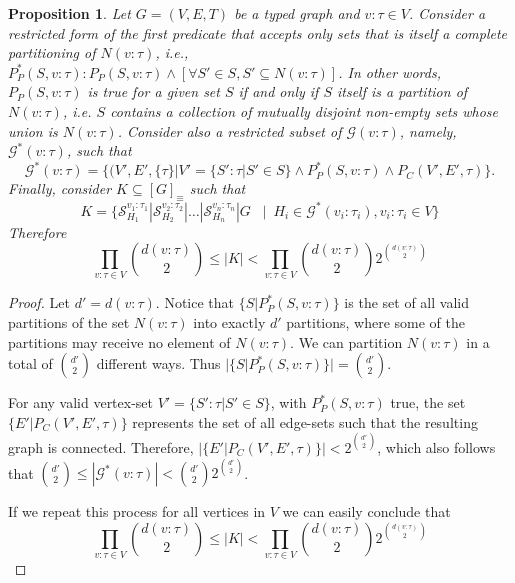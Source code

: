 \documentclass[preprint,12pt]{elsarticle}
\theoremstyle{plain}
\newtheorem{prop}[theorem]{Proposition}
\newcommand\tyv[2]{#1\!\!:\!\!#2}
\begin{document}
\begin{prop}\label{prop:sizereducedclass}
Let $G = (V,E,T)$ be a typed graph and $\tyv{v}{\tau}\in V$.
Consider a restricted form of the first predicate that accepts
only sets that is itself a complete partitioning of $N(\tyv{v}{\tau})$, i.e.,
$P_P^*(S, \tyv{v}{\tau}): P_P(S, \tyv{v}{\tau}) \wedge [\forall S'\in S, S'\subseteq N(\tyv{v}{\tau})]$.
In other words,
$P_P(S, \tyv{v}{\tau})$ is true for a given set $S$
if and only if
$S$ itself is a partition of $N(\tyv{v}{\tau})$,
i.e. $S$ contains 
a collection of mutually disjoint non-empty sets whose union is $N(\tyv{v}{\tau})$.
Consider also a restricted subset of $\mathcal{G}(\tyv{v}{\tau})$, namely, $\mathcal{G}^*(\tyv{v}{\tau})$, such that
\[
\mathcal{G}^*(\tyv{v}{\tau}) = \{(V',E',\{\tau\}|
    V'=\{\tyv{S'}{\tau}|S'\in S\}\wedge P_P^*(S, \tyv{v}{\tau}) \wedge P_C(V',E',\tau)\}.
\]
Finally, consider $K \subseteq [G]_\equiv$ such that
\[
K = \{ \mathcal{S}^{{v_1}:{\tau_1}}_{H_1}|\mathcal{S}^{{v_2}:{\tau_2}}_{H_2}|\dots|\mathcal{S}^{{v_n}:{\tau_n}}_{H_n}|G
             \,\,\,\,\,|\,\,\,   H_i\in\mathcal{G}^*(\tyv{v_i}{\tau_i}),\tyv{v_i}{\tau_i}\in V\}
\]
Therefore
\[
\prod_{v:\tau\in V} \binom{d(\tyv{v}{\tau})}{2} \leq |K| < \prod_{v:\tau\in V} \binom{d(\tyv{v}{\tau})}{2}2^{\binom{d(v:\tau)}{2}}
\]
\end{prop}
\begin{proof}
Let $d' = d(\tyv{v}{\tau})$.
Notice that $\{S|P_P^*(S, \tyv{v}{\tau})\}$
is the set of all
valid partitions of the set $N(\tyv{v}{\tau})$
into exactly $d'$ partitions, where some of the partitions may receive no
element of $N(\tyv{v}{\tau})$. We can partition $N(\tyv{v}{\tau})$
in a total of $\binom{d'}{2}$ different ways. Thus $|\{S|P_P^*(S, \tyv{v}{\tau})\}| = \binom{d'}{2}$.

For any valid vertex-set $V'=\{\tyv{S'}{\tau}|S'\in S\}$, with $P_P^*(S, \tyv{v}{\tau})$ true,
the set $\{E'| P_C(V',E',\tau)\}$ represents the set of all edge-sets such that the resulting graph is connected.
Therefore, $|\{E'| P_C(V',E',\tau)\}| < 2^{\binom{d'}{2}}$,
which also follows that $\binom{d'}{2} \leq |\mathcal{G}^*(\tyv{v}{\tau})| < \binom{d'}{2}2^{\binom{d'}{2}}$.

If we repeat this process for all vertices in $V$
we can easily conclude that
\[
\prod_{v:\tau\in V} \binom{d(\tyv{v}{\tau})}{2} \leq |K| < \prod_{v:\tau\in V} \binom{d(\tyv{v}{\tau})}{2}2^{\binom{d(v:\tau)}{2}}
\]
\end{proof}
\end{document}
